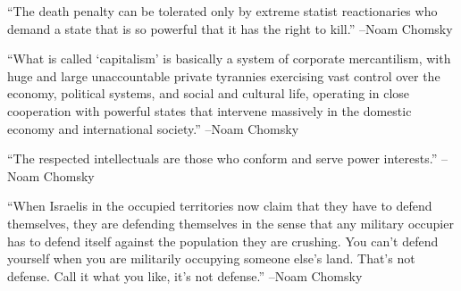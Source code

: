 \documentclass{article}%
\begin{document}
\linebreak%
\vspace{1mm}%
\begin{minipage}{\textwidth}%
\flushleft%
“The death penalty can be tolerated only by extreme statist reactionaries who demand a state that is so powerful that it has the right to kill.”%
\linebreak%
\vspace{1mm}%
–Noam Chomsky%
\linebreak%
\vspace{1mm}%
\end{minipage}%
\linebreak%
\vspace{1mm}%
\begin{minipage}{\textwidth}%
\flushleft%
“What is called ‘capitalism’ is basically a system of corporate mercantilism, with huge and large unaccountable private tyrannies exercising vast control over the economy, political systems, and social and cultural life, operating in close cooperation with powerful states that intervene massively in the domestic economy and international society.”%
\linebreak%
\vspace{1mm}%
–Noam Chomsky%
\linebreak%
\vspace{1mm}%
\end{minipage}%
\linebreak%
\vspace{1mm}%
\begin{minipage}{\textwidth}%
\flushleft%
“The respected intellectuals are those who conform and serve power interests.”%
\linebreak%
\vspace{1mm}%
–Noam Chomsky%
\linebreak%
\vspace{1mm}%
\end{minipage}%
\linebreak%
\vspace{1mm}%
\begin{minipage}{\textwidth}%
\flushleft%
“When Israelis in the occupied territories now claim that they have to defend themselves, they are defending themselves in the sense that any military occupier has to defend itself against the population they are crushing. You can't defend yourself when you are militarily occupying someone else's land. That's not defense. Call it what you like, it's not defense.”%
\linebreak%
\vspace{1mm}%
–Noam Chomsky%
\linebreak%
\vspace{1mm}%
\end{minipage}%
\end{document}
